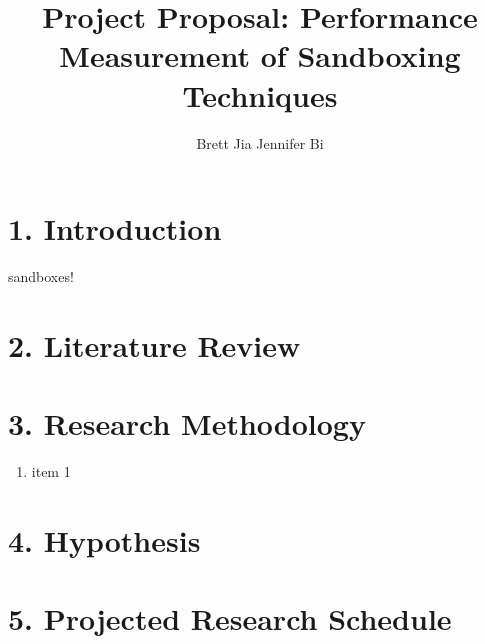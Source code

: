 \documentclass{proc}
\begin{document}
\title{Project Proposal: Performance Measurement of Sandboxing Techniques}

\author{Brett Jia \hspace{1em} Jennifer Bi}

\maketitle

\section*{1. Introduction}

sandboxes!

\section*{2. Literature Review}

\section*{3. Research Methodology}

\begin{enumerate}
\item item 1
\end{enumerate}

\section*{4. Hypothesis}

\section*{5. Projected Research Schedule}






\end{document}
